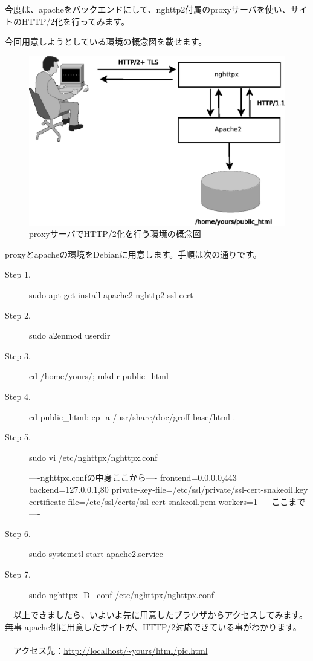 \documentclass[mingoth,a4paper]{jsarticle}
\begin{document}
 今度は、apacheをバックエンドにして、nghttp2付属のproxyサーバを使い、サイトのHTTP/2化を行ってみます。
  
 今回用意しようとしている環境の概念図を載せます。

\begin{figure}[H]
\begin{center}
 \includegraphics[width=0.5\hsize]{image201507/nghttpx-apache-proxying-mono.eps}
\end{center}
\caption{proxyサーバでHTTP/2化を行う環境の概念図}
\end{figure}
  
 proxyとapacheの環境をDebianに用意します。手順は次の通りです。

\begin{description}
\item [Step 1.] sudo apt-get install apache2 nghttp2 ssl-cert
\item [Step 2.] sudo a2enmod userdir
\item [Step 3.] cd /home/yours/; mkdir public\_html
\item [Step 4.] cd public\_html; cp -a /usr/share/doc/groff-base/html .
\item [Step 5.] sudo vi /etc/nghttpx/nghttpx.conf\\
\begin{commandline}
 ----nghttpx.confの中身ここから----
frontend=0.0.0.0,443 
backend=127.0.0.1,80 
private-key-file=/etc/ssl/private/ssl-cert-snakeoil.key 
certificate-file=/etc/ssl/certs/ssl-cert-snakeoil.pem 
workers=1 
----ここまで----
\end{commandline}
\item [Step 6.] sudo systemctl start apache2.service
\item [Step 7.] sudo nghttpx -D --conf /etc/nghttpx/nghttpx.conf
\end{description}

　以上できましたら、いよいよ先に用意したブラウザからアクセスしてみます。無事 apache側に用意したサイトが、HTTP/2対応できている事がわかります。\\
\\
　アクセス先：\url{http://localhost/~yours/html/pic.html}\\
\end{document}
